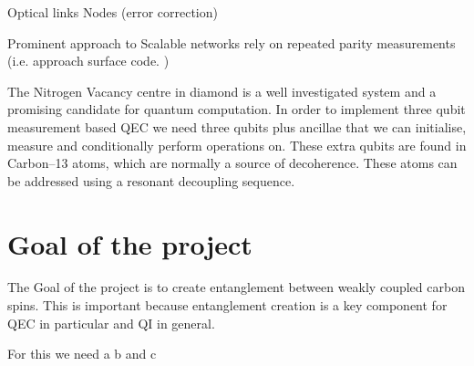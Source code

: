 Optical links \citep{Bernien2013Heralded,Pfaff2014Unconditional}
Nodes \citep{Taminiau2014Universal,Waldherr2014Quantum} (error correction)

Prominent approach to Scalable networks rely on repeated parity measurements (i.e. approach surface code. )







The Nitrogen Vacancy centre in diamond is a well investigated system\citep{Doherty2013NitrogenVacancy} and a promising candidate for quantum computation\citep{Childress2013Diamond}. In order to implement three qubit measurement based QEC we need three qubits plus ancillae that we can initialise, measure and conditionally perform operations on. These extra qubits are found in Carbon--13 atoms, which are normally a source of decoherence. These atoms can be addressed using a resonant decoupling sequence\citep{Taminiau2012Detection}.


\section{Goal of the project}
The Goal of the project is to create entanglement between weakly coupled carbon spins.
This is important because entanglement creation is a key component for QEC in particular and QI in general.

For this we need a b and c
